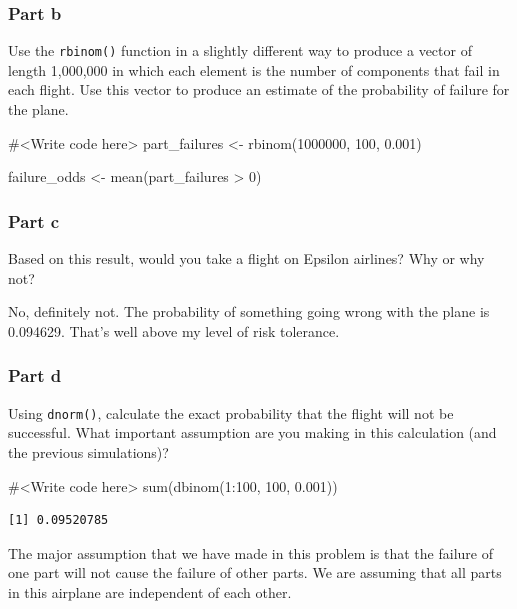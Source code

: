 \documentclass[
  letterpaper,
  DIV=11,
  numbers=noendperiod]{scrartcl}
\newenvironment{Shaded}{\begin{snugshade}}{\end{snugshade}}
\newcommand{\CommentTok}[1]{\textcolor[rgb]{0.37,0.37,0.37}{#1}}
\newcommand{\DecValTok}[1]{\textcolor[rgb]{0.68,0.00,0.00}{#1}}
\newcommand{\FloatTok}[1]{\textcolor[rgb]{0.68,0.00,0.00}{#1}}
\newcommand{\FunctionTok}[1]{\textcolor[rgb]{0.28,0.35,0.67}{#1}}
\newcommand{\NormalTok}[1]{\textcolor[rgb]{0.00,0.23,0.31}{#1}}
\newcommand{\OtherTok}[1]{\textcolor[rgb]{0.00,0.23,0.31}{#1}}
\newcommand{\SpecialCharTok}[1]{\textcolor[rgb]{0.37,0.37,0.37}{#1}}
\begin{document}
\hypertarget{part-b-6}{%
\subsubsection{Part b}\label{part-b-6}}

Use the \texttt{rbinom()} function in a slightly different way to
produce a vector of length 1,000,000 in which each element is the number
of components that fail in each flight. Use this vector to produce an
estimate of the probability of failure for the plane.

\begin{Shaded}
\begin{Highlighting}[]
\CommentTok{\#\textless{}Write code here\textgreater{}}
\NormalTok{part\_failures }\OtherTok{\textless{}{-}} \FunctionTok{rbinom}\NormalTok{(}\DecValTok{1000000}\NormalTok{, }\DecValTok{100}\NormalTok{, }\FloatTok{0.001}\NormalTok{)}

\NormalTok{failure\_odds }\OtherTok{\textless{}{-}} \FunctionTok{mean}\NormalTok{(part\_failures }\SpecialCharTok{\textgreater{}} \DecValTok{0}\NormalTok{)}
\end{Highlighting}
\end{Shaded}

\hypertarget{part-c-6}{%
\subsubsection{Part c}\label{part-c-6}}

Based on this result, would you take a flight on Epsilon airlines? Why
or why not?

No, definitely not. The probability of something going wrong with the
plane is 0.094629. That's well above my level of risk tolerance.

\hypertarget{part-d-1}{%
\subsubsection{Part d}\label{part-d-1}}

Using \texttt{dnorm()}, calculate the exact probability that the flight
will not be successful. What important assumption are you making in this
calculation (and the previous simulations)?

\begin{Shaded}
\begin{Highlighting}[]
\CommentTok{\#\textless{}Write code here\textgreater{}}
\FunctionTok{sum}\NormalTok{(}\FunctionTok{dbinom}\NormalTok{(}\DecValTok{1}\SpecialCharTok{:}\DecValTok{100}\NormalTok{, }\DecValTok{100}\NormalTok{, }\FloatTok{0.001}\NormalTok{))}
\end{Highlighting}
\end{Shaded}

\begin{verbatim}
[1] 0.09520785
\end{verbatim}

The major assumption that we have made in this problem is that the
failure of one part will not cause the failure of other parts. We are
assuming that all parts in this airplane are independent of each other.
\end{document}
